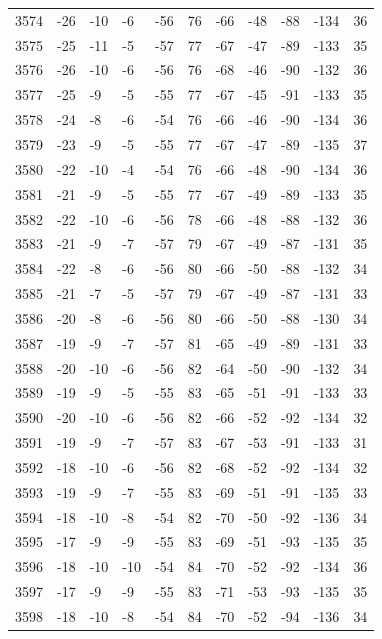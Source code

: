 \begin{table}[H]
\begin{tabular}{lllllllllll}
3574 & -26 & -10 & -6 & -56 & 76 & -66 & -48 & -88 & -134 & 36 \\
3575 & -25 & -11 & -5 & -57 & 77 & -67 & -47 & -89 & -133 & 35 \\
3576 & -26 & -10 & -6 & -56 & 76 & -68 & -46 & -90 & -132 & 36 \\
3577 & -25 & -9 & -5 & -55 & 77 & -67 & -45 & -91 & -133 & 35 \\
3578 & -24 & -8 & -6 & -54 & 76 & -66 & -46 & -90 & -134 & 36 \\
3579 & -23 & -9 & -5 & -55 & 77 & -67 & -47 & -89 & -135 & 37 \\
3580 & -22 & -10 & -4 & -54 & 76 & -66 & -48 & -90 & -134 & 36 \\
3581 & -21 & -9 & -5 & -55 & 77 & -67 & -49 & -89 & -133 & 35 \\
3582 & -22 & -10 & -6 & -56 & 78 & -66 & -48 & -88 & -132 & 36 \\
3583 & -21 & -9 & -7 & -57 & 79 & -67 & -49 & -87 & -131 & 35 \\
3584 & -22 & -8 & -6 & -56 & 80 & -66 & -50 & -88 & -132 & 34 \\
3585 & -21 & -7 & -5 & -57 & 79 & -67 & -49 & -87 & -131 & 33 \\
3586 & -20 & -8 & -6 & -56 & 80 & -66 & -50 & -88 & -130 & 34 \\
3587 & -19 & -9 & -7 & -57 & 81 & -65 & -49 & -89 & -131 & 33 \\
3588 & -20 & -10 & -6 & -56 & 82 & -64 & -50 & -90 & -132 & 34 \\
3589 & -19 & -9 & -5 & -55 & 83 & -65 & -51 & -91 & -133 & 33 \\
3590 & -20 & -10 & -6 & -56 & 82 & -66 & -52 & -92 & -134 & 32 \\
3591 & -19 & -9 & -7 & -57 & 83 & -67 & -53 & -91 & -133 & 31 \\
3592 & -18 & -10 & -6 & -56 & 82 & -68 & -52 & -92 & -134 & 32 \\
3593 & -19 & -9 & -7 & -55 & 83 & -69 & -51 & -91 & -135 & 33 \\
3594 & -18 & -10 & -8 & -54 & 82 & -70 & -50 & -92 & -136 & 34 \\
3595 & -17 & -9 & -9 & -55 & 83 & -69 & -51 & -93 & -135 & 35 \\
3596 & -18 & -10 & -10 & -54 & 84 & -70 & -52 & -92 & -134 & 36 \\
3597 & -17 & -9 & -9 & -55 & 83 & -71 & -53 & -93 & -135 & 35 \\
3598 & -18 & -10 & -8 & -54 & 84 & -70 & -52 & -94 & -136 & 34 \\

\end{tabular}
\end{table}
